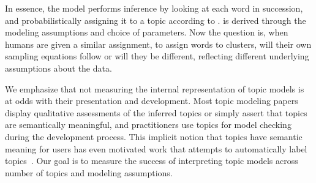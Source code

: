 In essence, the model performs inference by looking at each word in
succession, and probabilistically assigning it to a topic according to
.   is derived through the
modeling assumptions and choice of parameters.  Now the question is,
when humans are given a similar assignment, to assign words to
clusters, will their own sampling equations follow 
or will they be different, reflecting different underlying assumptions
about the data.

We emphasize that not measuring the internal representation of topic
models is at odds with their presentation and development.  Most topic
modeling papers display qualitative assessments of the inferred topics
or simply assert that topics are semantically meaningful, and
practitioners use topics for model checking during the development
process.  This implicit notion that topics have semantic meaning for
users has even motivated work that attempts to automatically label
topics~.  Our goal is to measure the success of
interpreting topic models across number of topics and modeling
assumptions.
